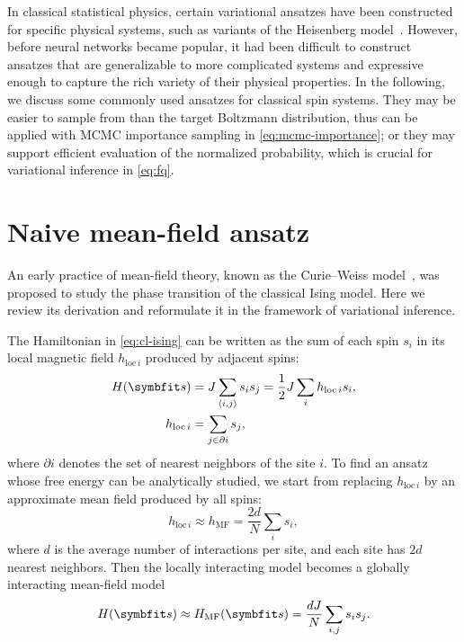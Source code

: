 In classical statistical physics, certain variational ansatzes have been constructed for specific physical systems, such as variants of the Heisenberg model~\cite{tsallis1976classical, castro2007free, carvalho2012variational}. However, before neural networks became popular, it had been difficult to construct ansatzes that are generalizable to more complicated systems and expressive enough to capture the rich variety of their physical properties. In the following, we discuss some commonly used ansatzes for classical spin systems. They may be easier to sample from than the target Boltzmann distribution, thus can be applied with MCMC importance sampling in \cref{eq:mcmc-importance}; or they may support efficient evaluation of the normalized probability, which is crucial for variational inference in \cref{eq:fq}.

\section{Naive mean-field ansatz}
\label{sec:nmf}

An early practice of mean-field theory, known as the Curie--Weiss model~\cite{weiss1907hypothese, nishimori2001statistical}, was proposed to study the phase transition of the classical Ising model. Here we review its derivation and reformulate it in the framework of variational inference.

The Hamiltonian in \cref{eq:cl-ising} can be written as the sum of each spin $s_i$ in its local magnetic field $h_{\text{loc}\,i}$ produced by adjacent spins:
\begin{align}
H(\vs) &= J \sum_{\langle i, j \rangle} s_i s_j
= \frac{1}{2} J \sum_i h_{\text{loc}\,i} s_i, \\
h_{\text{loc}\,i} &= \sum_{j \in \partial i} s_j,
\end{align}
where $\partial i$ denotes the set of nearest neighbors of the site $i$. To find an ansatz whose free energy can be analytically studied, we start from replacing $h_{\text{loc}\,i}$ by an approximate mean field produced by all spins:
\begin{equation}
h_{\text{loc}\,i} \approx h_\text{MF} = \frac{2 d}{N} \sum_i s_i,
\end{equation}
where $d$ is the average number of interactions per site, and each site has $2 d$ nearest neighbors. Then the locally interacting model becomes a globally interacting mean-field model
\begin{equation}
H(\vs) \approx H_\text{MF}(\vs) = \frac{d J}{N} \sum_{i, j} s_i s_j.
\label{eq:ham-mf}
\end{equation}

